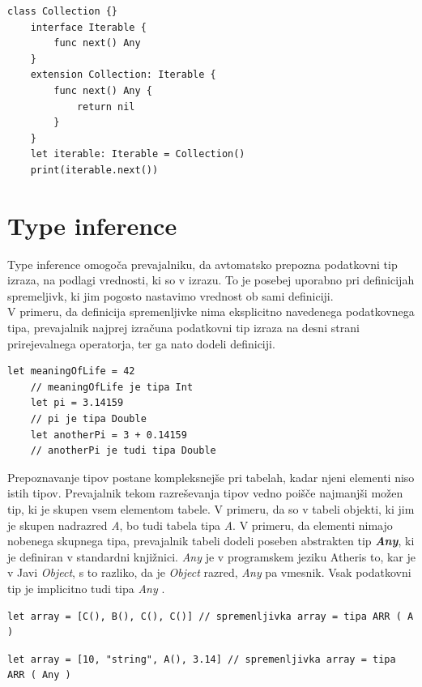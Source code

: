 \documentclass[a4paper, 12p]{book}
\begin{document}
\begin{lstlisting}[caption=Razširitev z vmesnikom, captionpos=b]
	class Collection {}
	interface Iterable {
	    func next() Any
	}
	extension Collection: Iterable {
	    func next() Any {
	        return nil
	    }
	}
	let iterable: Iterable = Collection()
	print(iterable.next())
\end{lstlisting}

\section{Type inference}

Type inference omogoča prevajalniku, da avtomatsko prepozna podatkovni tip izraza, na podlagi vrednosti, ki so v izrazu. To je posebej uporabno pri definicijah spremeljivk, ki jim pogosto nastavimo vrednost ob sami definiciji. \\
\indent V primeru, da definicija spremenljivke nima eksplicitno navedenega podatkovnega tipa, prevajalnik najprej izračuna podatkovni tip izraza na desni strani prirejevalnega operatorja, ter ga nato dodeli definiciji.

\begin{lstlisting}[caption={Avtomatično prepoznavanje podatkovnih tipov}, captionpos=b]
	let meaningOfLife = 42
	// meaningOfLife je tipa Int
	let pi = 3.14159
	// pi je tipa Double
	let anotherPi = 3 + 0.14159
	// anotherPi je tudi tipa Double
\end{lstlisting}

Prepoznavanje tipov postane kompleksnejše pri tabelah, kadar njeni elementi niso istih tipov. Prevajalnik tekom razreševanja tipov vedno poišče najmanjši možen tip, ki je skupen vsem elementom tabele. V primeru, da so v tabeli objekti, ki jim je skupen nadrazred \textit{A}, bo tudi tabela tipa \textit{A}. V primeru, da elementi nimajo nobenega skupnega tipa, prevajalnik tabeli dodeli poseben abstrakten tip \textit{\textbf{Any}}, ki je definiran v standardni knjižnici. \textit{Any} je v programskem jeziku Atheris to, kar je v Javi \textit{Object}, s to razliko, da je \textit{Object} razred, \textit{Any} pa vmesnik. Vsak podatkovni tip je implicitno tudi tipa \textit{Any} .

\begin{lstlisting}[caption={Elementi tabele s skupnim nadrazredom}, captionpos=b]
	let array = [C(), B(), C(), C()] // spremenljivka array = tipa ARR ( A )
\end{lstlisting}

\begin{lstlisting}[caption={Elementi tabele nimajo skupnega tipa}, captionpos=b]
	let array = [10, "string", A(), 3.14] // spremenljivka array = tipa ARR ( Any )
\end{lstlisting}
\end{document}
